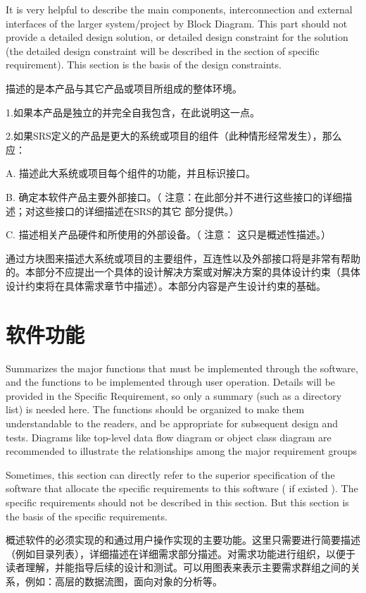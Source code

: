 It is very helpful to describe the main components, interconnection and external interfaces of the larger system/project by Block Diagram. This part should not provide a detailed design solution, or detailed design constraint for the solution (the detailed design constraint will be described in the section of specific requirement). This section is the basis of the design constraints.

描述的是本产品与其它产品或项目所组成的整体环境。

1.如果本产品是独立的并完全自我包含，在此说明这一点。

2.如果SRS定义的产品是更大的系统或项目的组件（此种情形经常发生），那么应：

	A. 描述此大系统或项目每个组件的功能，并且标识接口。

	B.  确定本软件产品主要外部接口。（ 注意：在此部分并不进行这些接口的详细描述；对这些接口的详细描述在SRS的其它 部分提供。）
    
    C. 描述相关产品硬件和所使用的外部设备。（  注意：  这只是概述性描述。）

通过方块图来描述大系统或项目的主要组件，互连性以及外部接口将是非常有帮助的。本部分不应提出一个具体的设计解决方案或对解决方案的具体设计约束（具体设计约束将在具体需求章节中描述）。本部分内容是产生设计约束的基础。

\section{软件功能}
Summarizes the major functions that must be implemented through the software, and the functions to be implemented through user operation. Details will be provided in the Specific Requirement, so only a summary (such as a directory list) is needed here. The functions should be organized to make them understandable to the readers, and be appropriate for subsequent design and tests. Diagrams like top-level data flow diagram or object class diagram are recommended to illustrate the relationships among the major requirement groups 

Sometimes, this section can directly refer to the superior specification of the software that allocate the specific requirements to this software ( if existed ).
The specific requirements should not be described in this section. But this section is the basis of the specific requirements.

概述软件的必须实现的和通过用户操作实现的主要功能。这里只需要进行简要描述（例如目录列表），详细描述在详细需求部分描述。对需求功能进行组织，以便于读者理解，并能指导后续的设计和测试。可以用图表来表示主要需求群组之间的关系，例如：高层的数据流图，面向对象的分析等。

